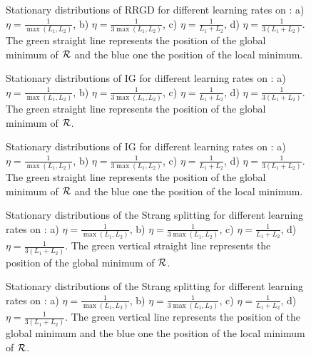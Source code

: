 \documentclass[article,authoryear,jmlmc]{beg_32}             %
\begin{document}
\begin{figure}[h!]
	\centering
	\scalebox{0.60}{}
	\caption{Stationary distributions of RRGD for different learning rates on \exTwo: a) $\eta=\frac{1}{\max(L_1,L_2)}$, b) $\eta=\frac{1}{3\max(L_1,L_2)}$, c) $\eta=\frac{1}{L_1+L_2}$, d) $\eta=\frac{1}{3(L_1+L_2)}$. The green straight line represents the position of the global minimum of $\mathcal{R}$ and the blue one the position of the local minimum.}
	\label{RRGD_ex2}
\end{figure}



\begin{figure}[h!]
	\centering
	\scalebox{0.60}{}
	\caption{Stationary distributions of IG for different learning rates on \exOne: a) $\eta=\frac{1}{\max(L_1,L_2)}$, b) $\eta=\frac{1}{3\max(L_1,L_2)}$, c) $\eta=\frac{1}{L_1+L_2}$, d) $\eta=\frac{1}{3(L_1+L_2)}$. The green straight line represents the position of the global minimum of $\mathcal{R}$.}
	\label{IG_ex1}
\end{figure}

\begin{figure}[h!]
	\centering
	\scalebox{0.60}{}
	\caption{Stationary distributions of IG for different learning rates on \exTwo: a) $\eta=\frac{1}{\max(L_1,L_2)}$, b) $\eta=\frac{1}{3\max(L_1,L_2)}$, c) $\eta=\frac{1}{L_1+L_2}$, d) $\eta=\frac{1}{3(L_1+L_2)}$. The green straight line represents the position of the global minimum of $\mathcal{R}$ and the blue one the position of the local minimum.}
	\label{IG_ex2}
\end{figure}

\begin{figure}[h!]
	\centering
	\scalebox{0.60}{}
	\caption{Stationary distributions of the Strang splitting for different learning rates on \exOne: a) $\eta=\frac{1}{\max(L_1,L_2)}$, b) $\eta=\frac{1}{3\max(L_1,L_2)}$, c) $\eta=\frac{1}{L_1+L_2}$, d) $\eta=\frac{1}{3(L_1+L_2)}$. The green vertical straight line represents the position of the global minimum of $\mathcal{R}$.}
	\label{Strang_ex1}
\end{figure}

\begin{figure}[h!]
	\centering
	\scalebox{0.60}{}
	\caption{Stationary distributions of the Strang splitting for different learning rates on \exTwo: a) $\eta=\frac{1}{\max(L_1,L_2)}$, b) $\eta=\frac{1}{3\max(L_1,L_2)}$, c) $\eta=\frac{1}{L_1+L_2}$, d) $\eta=\frac{1}{3(L_1+L_2)}$. The green vertical line represents the position of the global minimum and the blue one the position of the local minimum of $\mathcal{R}$.}
	\label{Strang_ex2}
\end{figure} 
\end{document}
